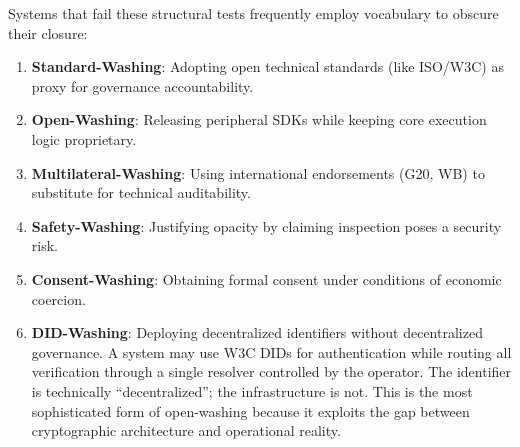 \documentclass{article}
\begin{document}
Systems that fail these structural tests frequently employ vocabulary to obscure their closure:
\begin{enumerate}
    \item \textbf{Standard-Washing}: Adopting open technical standards (like ISO/W3C) as proxy for governance accountability.
    \item \textbf{Open-Washing}: Releasing peripheral SDKs while keeping core execution logic proprietary.
    \item \textbf{Multilateral-Washing}: Using international endorsements (G20, WB) to substitute for technical auditability.
    \item \textbf{Safety-Washing}: Justifying opacity by claiming inspection poses a security risk.
    \item \textbf{Consent-Washing}: Obtaining formal consent under conditions of economic coercion.
    \item \textbf{DID-Washing}: Deploying decentralized identifiers without decentralized governance. A system may use W3C DIDs for authentication while routing all verification through a single resolver controlled by the operator. The identifier is technically ``decentralized''; the infrastructure is not. This is the most sophisticated form of open-washing because it exploits the gap between cryptographic architecture and operational reality.
\end{enumerate}
\end{document}
